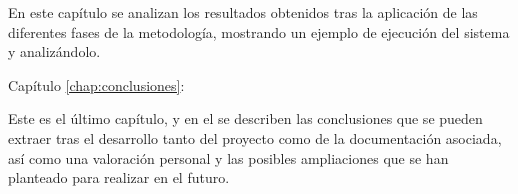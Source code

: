 \begin{definitionlist}
En este capítulo se analizan los resultados obtenidos tras la aplicación de las diferentes fases de la metodología, mostrando un ejemplo de ejecución del sistema y analizándolo.

\item[Capítulo \ref{chap:conclusiones}:\nameref{chap:conclusiones}]

Este es el último capítulo, y en el se describen las conclusiones que se pueden extraer tras el desarrollo tanto del proyecto como de la documentación asociada, así como una valoración personal y las posibles ampliaciones que se han planteado para realizar en el futuro.

\end{definitionlist}


